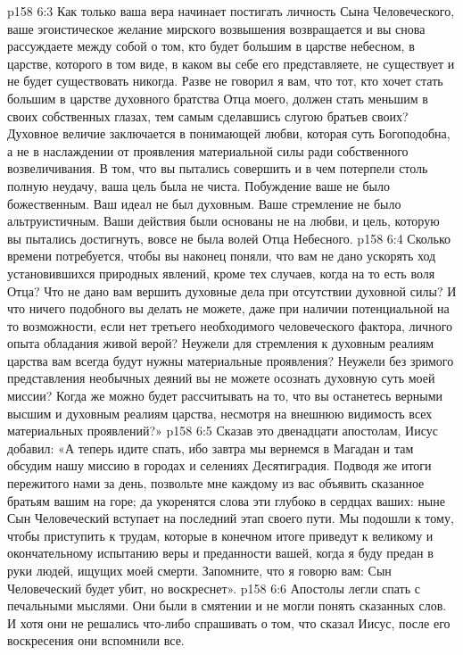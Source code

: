 \vs p158 6:3 Как только ваша вера начинает постигать личность Сына Человеческого, ваше эгоистическое желание мирского возвышения возвращается и вы снова рассуждаете между собой о том, кто будет большим в царстве небесном, в царстве, которого в том виде, в каком вы себе его представляете, не существует и не будет существовать никогда. Разве не говорил я вам, что тот, кто хочет стать большим в царстве духовного братства Отца моего, должен стать меньшим в своих собственных глазах, тем самым сделавшись слугою братьев своих? Духовное величие заключается в понимающей любви, которая суть Богоподобна, а не в наслаждении от проявления материальной силы ради собственного возвеличивания. В том, что вы пытались совершить и в чем потерпели столь полную неудачу, ваша цель была не чиста. Побуждение ваше не было божественным. Ваш идеал не был духовным. Ваше стремление не было альтруистичным. Ваши действия были основаны не на любви, и цель, которую вы пытались достигнуть, вовсе не была волей Отца Небесного.
\vs p158 6:4 Сколько времени потребуется, чтобы вы наконец поняли, что вам не дано ускорять ход установившихся природных явлений, кроме тех случаев, когда на то есть воля Отца? Что не дано вам вершить духовные дела при отсутствии духовной силы? И что ничего подобного вы делать не можете, даже при наличии потенциальной на то возможности, если нет третьего необходимого человеческого фактора, личного опыта обладания живой верой? Неужели для стремления к духовным реалиям царства вам всегда будут нужны материальные проявления? Неужели без зримого представления необычных деяний вы не можете осознать духовную суть моей миссии? Когда же можно будет рассчитывать на то, что вы останетесь верными высшим и духовным реалиям царства, несмотря на внешнюю видимость всех материальных проявлений?»
\vs p158 6:5 Сказав это двенадцати апостолам, Иисус добавил: «А теперь идите спать, ибо завтра мы вернемся в Магадан и там обсудим нашу миссию в городах и селениях Десятиградия. Подводя же итоги пережитого нами за день, позвольте мне каждому из вас объявить сказанное братьям вашим на горе; да укоренятся слова эти глубоко в сердцах ваших: ныне Сын Человеческий вступает на последний этап своего пути. Мы подошли к тому, чтобы приступить к трудам, которые в конечном итоге приведут к великому и окончательному испытанию веры и преданности вашей, когда я буду предан в руки людей, ищущих моей смерти. Запомните, что я говорю вам: Сын Человеческий будет убит, но воскреснет».
\vs p158 6:6 Апостолы легли спать с печальными мыслями. Они были в смятении и не могли понять сказанных слов. И хотя они не решались что\hyp{}либо спрашивать о том, что сказал Иисус, после его воскресения они вспомнили все.
